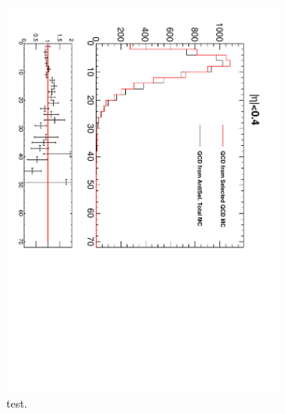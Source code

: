 \begin{figure}[htbp]
  \centering
  \begin{subfigure}{0.45\textwidth}
    \centering
    \includegraphics*[trim = 0mm 0mm 15mm 0mm, clip, width=\textwidth, angle=90]{MetCompare_anti_eta1.pdf}
    \caption{test.}
    \label{fig:qcd_met_eta1}
  \end{subfigure}
  \begin{subfigure}{0.45\textwidth}
    \centering

\end{subfigure}
\end{figure}
